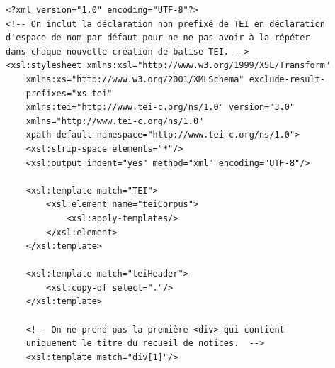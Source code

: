 \documentclass[a4paper,12pt,twoside]{book}
\begin{document}
	\begin{verbatim}
<?xml version="1.0" encoding="UTF-8"?>
<!-- On inclut la déclaration non prefixé de TEI en déclaration 
d'espace de nom par défaut pour ne ne pas avoir à la répéter
dans chaque nouvelle création de balise TEI. -->
<xsl:stylesheet xmlns:xsl="http://www.w3.org/1999/XSL/Transform"
    xmlns:xs="http://www.w3.org/2001/XMLSchema" exclude-result-
    prefixes="xs tei" 
    xmlns:tei="http://www.tei-c.org/ns/1.0" version="3.0"
    xmlns="http://www.tei-c.org/ns/1.0"
    xpath-default-namespace="http://www.tei-c.org/ns/1.0">
    <xsl:strip-space elements="*"/>
    <xsl:output indent="yes" method="xml" encoding="UTF-8"/>
    
    <xsl:template match="TEI">
        <xsl:element name="teiCorpus">
            <xsl:apply-templates/>
        </xsl:element>
    </xsl:template>
    
    <xsl:template match="teiHeader">
        <xsl:copy-of select="."/>
    </xsl:template>
    
    <!-- On ne prend pas la première <div> qui contient 
    uniquement le titre du recueil de notices.  -->
    <xsl:template match="div[1]"/>
    

\end{verbatim}
\end{document}
